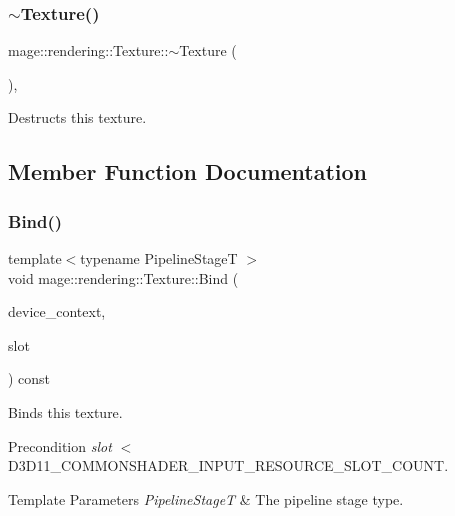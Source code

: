 \subsubsection{\texorpdfstring{$\sim$\+Texture()}{~Texture()}}
{\footnotesize\ttfamily mage\+::rendering\+::\+Texture\+::$\sim$\+Texture (\begin{DoxyParamCaption}{ }\end{DoxyParamCaption})\hspace{0.3cm}{\ttfamily [virtual]}, {\ttfamily [default]}}

Destructs this texture. 

\subsection{Member Function Documentation}
\mbox{\label{classmage_1_1rendering_1_1_texture_a2189fabd729f433b96b62fa409968677}} 
\subsubsection{\texorpdfstring{Bind()}{Bind()}}
{\footnotesize\ttfamily template$<$typename Pipeline\+StageT $>$ \\
void mage\+::rendering\+::\+Texture\+::\+Bind (\begin{DoxyParamCaption}\item[{I\+D3\+D11\+Device\+Context \&}]{device\+\_\+context,  }\item[{\mbox{\hyperlink{namespacemage_a41c104c036fba3756a74e19f793eeaa1}{U32}}}]{slot }\end{DoxyParamCaption}) const\hspace{0.3cm}{\ttfamily [noexcept]}}

Binds this texture.

\begin{DoxyPrecond}{Precondition}
{\itshape slot} $<$ {\ttfamily D3\+D11\+\_\+\+C\+O\+M\+M\+O\+N\+S\+H\+A\+D\+E\+R\+\_\+\+I\+N\+P\+U\+T\+\_\+\+R\+E\+S\+O\+U\+R\+C\+E\+\_\+\+S\+L\+O\+T\+\_\+\+C\+O\+U\+NT}. 
\end{DoxyPrecond}

\begin{DoxyTemplParams}{Template Parameters}
{\em Pipeline\+StageT} & The pipeline stage type. \\
\hline
\end{DoxyTemplParams}

